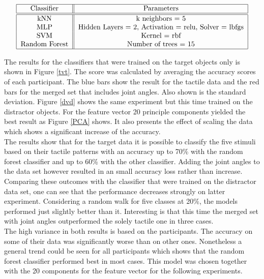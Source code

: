 \begin{align}
	\begin{tabular}{|c||c|}
		\hline
		Classifier & Parameters \\
		\hline\hline
		kNN & k neighbors = 5 \\
		MLP & Hidden Layers = 2, Activation = relu, Solver = lbfgs  \\
		SVM & Kernel = rbf \\
		Random Forest & Number of trees = 15 \\
		\hline
	\end{tabular}
	\label{classifiers}
\end{align}  

The results for the classifiers that were trained on the target objects only is shown in Figure \ref{tvt}. The score was calculated by averaging the accuracy scores of each participant. The blue bars show the result for the tactile data and the red bars for the merged set that includes joint angles. Also shown is the standard deviation. Figure \ref{dvd} shows the same experiment but this time trained on the distractor objects. For the feature vector 20 principle components yielded the best result as Figure \ref{PCA} shows. It also presents the effect of scaling the data which shows a significant increase of the accuracy.\\
The results show that for the target data it is possible to classify the five stimuli based on their tactile patterns with an accuracy up to 70\% with the random forest classifier and up to 60\% with the other classifier. Adding the joint angles to the data set however resulted in an small accuracy loss rather than increase.\\
Comparing these outcomes with the classifier that were trained on the distractor data set, one can see that the performance decreases strongly on latter experiment. Considering a random walk for five classes at 20\%, the models performed just slightly better than it. Interesting is that this time the merged set with joint angles outperformed the solely tactile one in three cases.\\     
The high variance in both results is based on the participants. The accuracy on some of their data was significantly worse than on other ones. Nonetheless a general trend could be seen for all participants which shows that the random forest classifier performed best in most cases. This model was chosen together with the 20 components for the feature vector for the following experiments.\\
